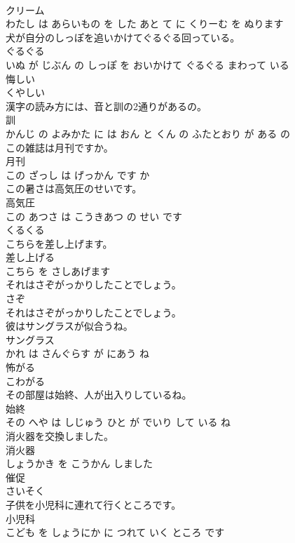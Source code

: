 \documentclass[8pt]{extreport}
\begin{document}
\begin{CJK}{UTF8}{min}
\\	クリーム 
\\	わたし は あらいもの を した あと て に くりーむ を ぬります			
\\	犬が自分のしっぽを追いかけてぐるぐる回っている。	
\\	ぐるぐる 
\\	いぬ が じぶん の しっぽ を おいかけて ぐるぐる まわって いる			
\\	悔しい	
\\	くやしい		
\\	漢字の読み方には、音と訓の2通りがあるの。	
\\	訓 
\\	かんじ の よみかた に は おん と くん の ふたとおり が ある の			
\\	この雑誌は月刊ですか。	
\\	月刊 
\\	この ざっし は げっかん です か			
\\	この暑さは高気圧のせいです。	
\\	高気圧 
\\	この あつさ は こうきあつ の せい です			
\\	くるくる	
\\	こちらを差し上げます。	
\\	差し上げる 
\\	こちら を さしあげます			
\\	それはさぞがっかりしたことでしょう。	
\\	さぞ 
\\	それはさぞがっかりしたことでしょう。			
\\	彼はサングラスが似合うね。	
\\	サングラス 
\\	かれ は さんぐらす が にあう ね			
\\	怖がる	
\\	こわがる		
\\	その部屋は始終、人が出入りしているね。	
\\	始終 
\\	その へや は しじゅう ひと が でいり して いる ね			
\\	消火器を交換しました。	
\\	消火器 
\\	しょうかき を こうかん しました			
\\	催促	
\\	さいそく		
\\	子供を小児科に連れて行くところです。	
\\	小児科 
\\	こども を しょうにか に つれて いく ところ です			

\end{CJK}
\end{document}
